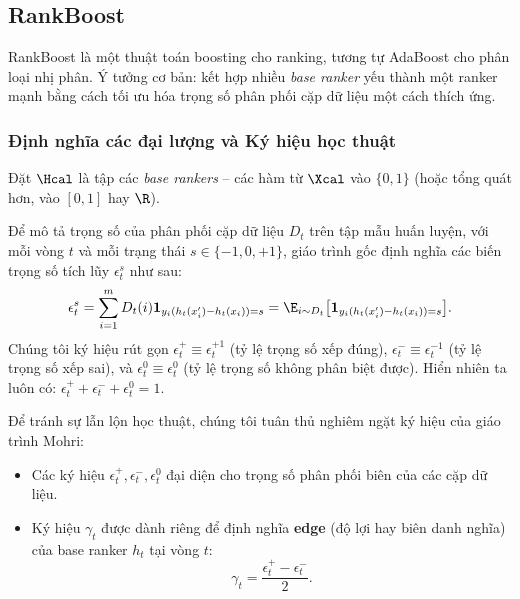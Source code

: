 \subsection{RankBoost}
\label{sec:rankboost}

RankBoost \citep{freund2003efficient} là một thuật toán boosting cho ranking,
tương tự AdaBoost cho phân loại nhị phân. Ý tưởng cơ bản: kết hợp nhiều
\textit{base ranker} yếu thành một ranker mạnh bằng cách tối ưu hóa trọng số phân phối cặp dữ liệu một cách thích ứng.

\subsubsection{Định nghĩa các đại lượng và Ký hiệu học thuật}

Đặt $\Hcal$ là tập các \textit{base rankers} -- các hàm từ $\Xcal$ vào $\{0, 1\}$ (hoặc tổng quát hơn, vào $[0, 1]$ hay $\R$).

Để mô tả trọng số của phân phối cặp dữ liệu $D_t$ trên tập mẫu huấn luyện, với mỗi vòng $t$ và mỗi trạng thái $s \in \{-1, 0, +1\}$, giáo trình gốc \citep{mohri2018foundations} định nghĩa các biến trọng số tích lũy $\epsilon^s_t$ như sau:
\begin{equation}
    \epsilon^s_t = \sum_{i=1}^m D_t(i) \mathbf{1}_{y_i(h_t(x'_i) - h_t(x_i)) = s}
    = \E_{i \sim D_t}\bigl[\mathbf{1}_{y_i(h_t(x'_i) - h_t(x_i)) = s}\bigr].
    \label{eq:epsilon_def}
\end{equation}
Chúng tôi ký hiệu rút gọn $\epsilon^+_t \equiv \epsilon^{+1}_t$ (tỷ lệ trọng số xếp đúng), $\epsilon^-_t \equiv \epsilon^{-1}_t$ (tỷ lệ trọng số xếp sai), và $\epsilon^0_t \equiv \epsilon^0_t$ (tỷ lệ trọng số không phân biệt được). Hiển nhiên ta luôn có: $\epsilon^+_t + \epsilon^-_t + \epsilon^0_t = 1$.

Để tránh sự lẫn lộn học thuật, chúng tôi tuân thủ nghiêm ngặt ký hiệu của giáo trình Mohri:
\begin{itemize}
    \item Các ký hiệu $\epsilon^+_t, \epsilon^-_t, \epsilon^0_t$ đại diện cho trọng số phân phối biên của các cặp dữ liệu.
    \item Ký hiệu $\gamma_t$ được dành riêng để định nghĩa \textbf{edge} (độ lợi hay biên danh nghĩa) của base ranker $h_t$ tại vòng $t$:
    \begin{equation}
        \gamma_t = \frac{\epsilon^+_t - \epsilon^-_t}{2}.
        \label{eq:edge_def}
    \end{equation}
\end{itemize}

